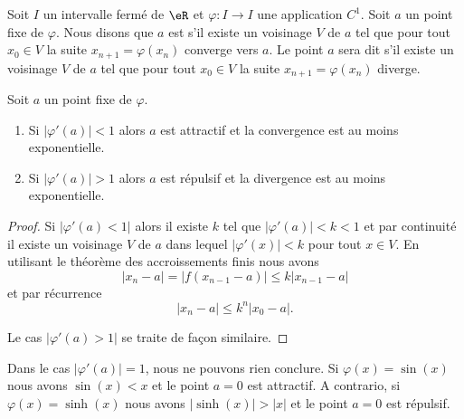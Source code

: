 \begin{definition}      \label{DEFooTMZUooMoBDGC}
    Soit \( I\) un intervalle fermé de \( \eR\) et \( \varphi\colon I\to I\) une application \( C^1\). Soit \( a\) un point fixe de \( \varphi\). Nous disons que \( a\) est  s'il existe un voisinage \( V\) de \( a\) tel que pour tout \( x_0\in V\) la suite \( x_{n+1}=\varphi(x_n)\) converge vers \( a\). Le point \( a\) sera dit  s'il existe un voisinage \( V\) de \( a\) tel que pour tout \( x_0\in V\) la suite \( x_{n+1}=\varphi(x_n)\) diverge.
\end{definition}

\begin{lemma}
    Soit \( a\) un point fixe de \( \varphi\).
    \begin{enumerate}
        \item
    Si \( | \varphi'(a) |<1\) alors \( a\) est attractif et la convergence est au moins exponentielle.
\item
    Si \( | \varphi'(a) |>1\) alors \( a\) est répulsif et la divergence est au moins exponentielle.
    \end{enumerate}
\end{lemma}

\begin{proof}
    Si \( | \varphi'(a)<1 |\) alors il existe \( k\) tel que \( | \varphi'(a) |<k<1\) et par continuité il existe un voisinage \( V\) de \( a\) dans lequel \( | \varphi'(x) |<k\) pour tout \( x\in V\). En utilisant le théorème des accroissements finis nous avons
    \begin{equation}
        | x_n-a |=\big| f(x_{n-1}-a) \big|\leq k| x_{n-1}-a |
    \end{equation}
    et par récurrence
    \begin{equation}
        | x_n-a |\leq k^n| x_0-a |.
    \end{equation}

    Le cas \( | \varphi'(a)>1 |\) se traite de façon similaire.
\end{proof}

\begin{remark}
    Dans le cas \(| \varphi'(a) |=1\), nous ne pouvons rien conclure. Si \( \varphi(x)=\sin(x)\) nous avons \( \sin(x)<x\) et le point \( a=0\) est attractif. A contrario, si \( \varphi(x)=\sinh(x)\) nous avons \( |\sinh(x)|>|x|\) et le point \( a=0\) est répulsif.
\end{remark}

